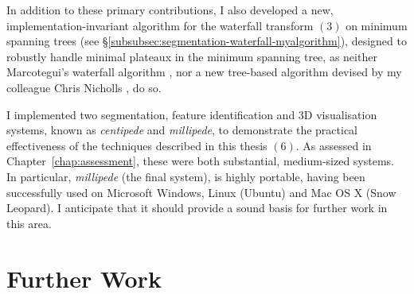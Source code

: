 %
In addition to these primary contributions, I also developed a new, implementation-invariant algorithm for the waterfall transform $(3)$ on minimum spanning trees (see \S\ref{subsubsec:segmentation-waterfall-myalgorithm}), designed to robustly handle minimal plateaux in the minimum spanning tree, as neither Marcotegui's waterfall algorithm \cite{marcotegui05}, nor a new tree-based algorithm devised by my colleague Chris Nicholls \cite{nicholls09}, do so.

I implemented two segmentation, feature identification and 3D visualisation systems, known as \emph{centipede} and \emph{millipede}, to demonstrate the practical effectiveness of the techniques described in this thesis $(6)$. As assessed in Chapter~\ref{chap:assessment}, these were both substantial, medium-sized systems. In particular, \emph{millipede} (the final system), is highly portable, having been successfully used on Microsoft Windows, Linux (Ubuntu) and Mac OS X (Snow Leopard). I anticipate that it should provide a sound basis for further work in this area.

\section{Further Work}
\label{sec:conclusions-furtherwork}

\iffalse


